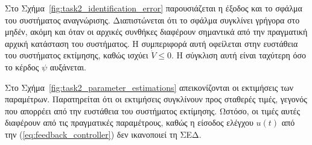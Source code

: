 \documentclass[a4paper,12pt]{article}
\begin{document}
Στο Σχήμα~\ref{fig:task2_identification_error} παρουσιάζεται η έξοδος και το σφάλμα του συστήματος αναγνώρισης.
Διαπιστώνεται ότι το σφάλμα συγκλίνει γρήγορα στο μηδέν, ακόμη και όταν οι αρχικές συνθήκες διαφέρουν σημαντικά
από την πραγματική αρχική κατάσταση του συστήματος. Η συμπεριφορά αυτή οφείλεται στην ευστάθεια του συστήματος
εκτίμησης, καθώς ισχύει $\dot{V} \leq 0$. Η σύγκλιση αυτή είναι ταχύτερη όσο το κέρδος $\psi$ αυξάνεται. 

Στο Σχήμα~\ref{fig:task2_parameter_estimations} απεικονίζονται οι εκτιμήσεις των παραμέτρων. Παρατηρείται ότι
οι εκτιμήσεις συγκλίνουν προς σταθερές τιμές, γεγονός που απορρέει από την ευστάθεια του συστήματος εκτίμησης.
Ωστόσο, οι τιμές αυτές διαφέρουν από τις πραγματικές παραμέτρους, καθώς η είσοδος ελέγχου $u(t)$ από την 
(\ref{eq:feedback_controller}) δεν ικανοποιεί τη ΣΕΔ.
\end{document}
